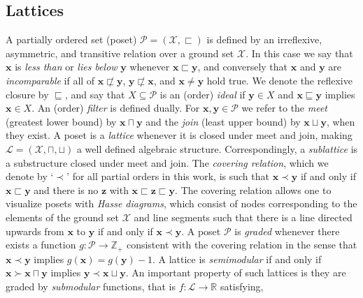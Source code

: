 \documentclass[11pt]{article}
\newcommand{\ideal}[1]{\mathop{\downarrow}#1}
\providecommand{\L}{}
\renewcommand{\L}{\mathscr{L}}
\begin{document}
\subsection{Lattices}
A partially ordered set (poset) $\mathscr{P} = (\mathcal{X}, \sqsubset)$ is defined by an irreflexive, asymmetric, and transitive relation over a ground set $\mathcal{X}$.
In this case we say that $\mathbf{x}$ is \emph{less than} or \emph{lies below} $\mathbf{y}$ whenever $\mathbf{x} \sqsubset \mathbf{y}$, and conversely that $\mathbf{x}$ and $\mathbf{y}$ are \emph{incomparable} if all of $\mathbf{x} \not\sqsubset \mathbf{y}$, $\mathbf{y} \not\sqsubset \mathbf{x}$, and $\mathbf{x} \neq \mathbf{y}$ hold true.
We denote the reflexive closure by $\sqsubseteq$, and say that $X \subseteq \mathscr{P}$ is an (order) \emph{ideal} if $\mathbf{y} \in X$ and $\mathbf{x} \sqsubseteq \mathbf{y}$ implies $\mathbf{x} \in X$.
An (order) \emph{filter} is defined dually.
For $\mathbf{x},\mathbf{y}\in\mathscr{P}$ we refer to the \emph{meet} (greatest lower bound) by $\mathbf{x} \sqcap \mathbf{y}$ and the \emph{join} (least upper bound) by $\mathbf{x} \sqcup \mathbf{y}$, when they exist.
A poset is a \emph{lattice} whenever it is closed under meet and join, making $\L=(\mathcal{X},\sqcap,\sqcup)$ a well defined algebraic structure.
Correspondingly, a \emph{sublattice} is a substructure closed under meet and join.
The \emph{covering relation}, which we denote by `$\prec$' for all partial orders in this work, is such that $\mathbf{x} \prec \mathbf{y}$ if and only if $\mathbf{x} \sqsubset \mathbf{y}$ and there is no $\mathbf{z}$ with $\mathbf{x} \sqsubset \mathbf{z} \sqsubset \mathbf{y}$.
The covering relation allows one to visualize posets with \emph{Hasse diagrams}, which consist of nodes corresponding to the elements of the ground set $\mathcal{X}$ and line segments such that there is a line directed upwards from $\mathbf{x}$ to $\mathbf{y}$ if and only if $\mathbf{x} \prec \mathbf{y}$.
A poset $\mathscr{P}$ is \emph{graded} whenever there exists a function $g:\mathscr{P}\to\mathbb{Z}_+$ consistent with the covering relation in the sense that $\mathbf{x} \prec \mathbf{y}$ implies $g(\mathbf{x}) = g(\mathbf{y}) - 1$.
A lattice is \emph{semimodular} if and only if $\mathbf{x} \succ \mathbf{x} \sqcap \mathbf{y}$ implies $\mathbf{y} \prec \mathbf{x} \sqcup \mathbf{y}$.
An important property of such lattices is they are graded by \emph{submodular} functions, that is $f:\L\to\mathbb{R}$ satisfying,
\end{document}
